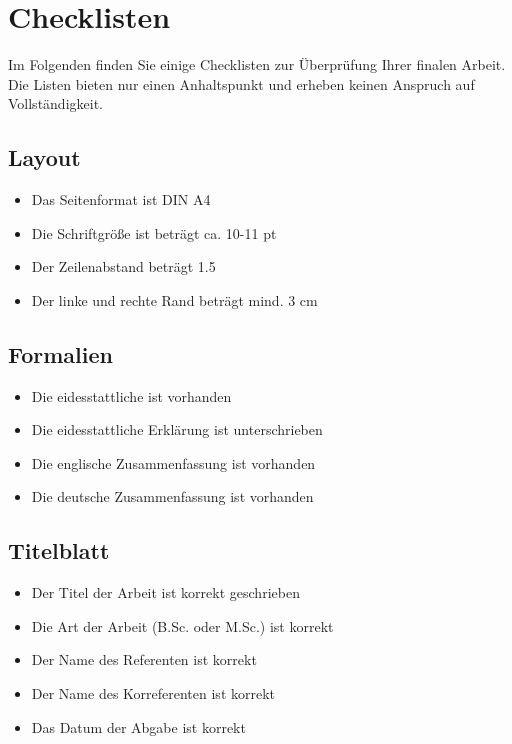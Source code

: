 \section{Checklisten}\label{sec:checklists}
%
Im Folgenden finden Sie einige Checklisten zur Überprüfung Ihrer finalen Arbeit. Die Listen bieten nur einen Anhaltspunkt und erheben keinen Anspruch auf Vollständigkeit. 

\subsection*{Layout}\label{sec:checklists:layout}
%
\begin{itemize}
  \vspace{-3mm}
  \item[\Square] Das Seitenformat ist DIN A4 
  \item[\Square] Die Schriftgröße ist beträgt ca. 10-11 pt
  \item[\Square] Der Zeilenabstand beträgt 1.5
  \item[\Square] Der linke und rechte Rand beträgt mind. 3 cm
\end{itemize}

\subsection*{Formalien}\label{sec:checklists:formalities}
%
\begin{itemize}
  \vspace{-3mm}
  \item[\Square] Die eidesstattliche  ist vorhanden
  \item[\Square] Die eidesstattliche Erklärung ist unterschrieben
  \item[\Square] Die englische Zusammenfassung ist vorhanden
  \item[\Square] Die deutsche Zusammenfassung ist vorhanden
\end{itemize}

\subsection*{Titelblatt}\label{sec:checklists:titlepage}
%
\begin{itemize}
  \vspace{-3mm}
  \item[\Square] Der Titel der Arbeit ist korrekt geschrieben
  \item[\Square] Die Art der Arbeit (B.Sc. oder M.Sc.) ist korrekt 
  \item[\Square] Der Name des Referenten ist korrekt
  \item[\Square] Der Name des Korreferenten ist korrekt
  \item[\Square] Das Datum der Abgabe ist korrekt
\end{itemize}

